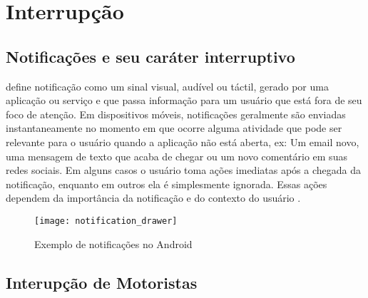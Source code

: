 \section{Interrupção}
\label{interrupcao}



\subsection{Notificações e seu caráter interruptivo}
\label{notificacao}

\cite{iqbal2010notifications} define notificação como um sinal visual, audível ou táctil, gerado por uma aplicação
ou serviço e que passa informação para um usuário que está fora de seu foco de atenção. Em dispositivos móveis,
notificações geralmente são enviadas instantaneamente no momento em que ocorre alguma atividade que pode ser relevante
para o usuário quando a aplicação não está aberta, ex: Um email novo, uma mensagem de texto que acaba de chegar ou um
novo comentário em suas redes sociais. Em alguns casos o usuário toma ações imediatas após a chegada da notificação,
enquanto em outros ela é simplesmente ignorada. Essas ações dependem da importância da notificação e do contexto do
usuário \cite{sahami2014large}.

\begin{figure}[h]
\centering
\texttt{[image: notification\_drawer]}
\caption{Exemplo de notificações no Android \cite{notificationDrawer}}
\label{notification-drawer}
\end{figure}

\subsection{Interupção de Motoristas}
\label{interrupcao-motoristas}
